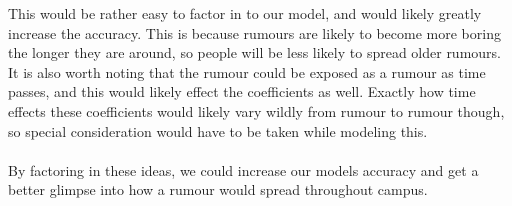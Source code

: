 \documentclass[11pt]{article}
\begin{document}
This would be rather easy to factor in to our model, and would likely greatly increase the accuracy. 
This is because rumours are likely to become more boring the longer they are around, so people will be less likely to spread older rumours.
It is also worth noting that the rumour could be exposed as a rumour as time passes, and this would likely effect the coefficients as well.
Exactly how time effects these coefficients would likely vary wildly from rumour to rumour though, so special consideration would have to be taken while modeling this. \\ \\
By factoring in these ideas, we could increase our models accuracy and get a better glimpse into how a rumour would spread throughout campus.
\end{document}
